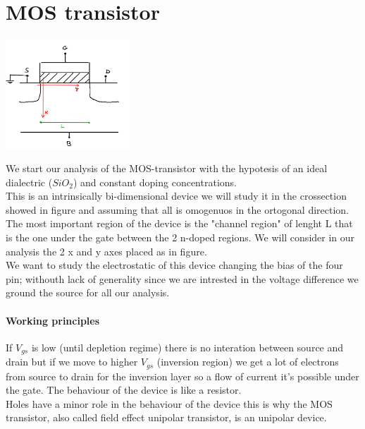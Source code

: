 \chapter{MOS transistor}
\centering
\includegraphics[width=0.35\textwidth]{mos1.png}\\
\raggedright

We start our analysis of the MOS-transistor with the hypotesis of an ideal dialectric ($SiO_2$) and constant doping concentrations.\\
This is an intrinsically bi-dimensional device we will study it in the crossection showed in figure and assuming that all is omogenuos in the ortogonal direction.\\
The most important region of the device is the "channel region" of lenght L that is the one under the gate between the 2 n-doped regions. We will consider in our analysis the 2 x and y axes placed as in figure.\\
We want to study the electrostatic of this device changing the bias of the four pin; withouth lack of generality since we are intrested in the voltage difference we ground the source for all our analysis.\\

\subsubsection{Working principles}
If $V_{gs}$ is low (until depletion regime) there is no interation between source and drain but if we move to higher $V_{gs}$ (inversion region) we get a lot of electrons from source to drain for the inversion layer so a flow of current it's possible under the gate. The behaviour of the device is like a resistor.\\
Holes have a minor role in the behaviour of the device this is why the MOS transistor, also called field effect unipolar transistor, is an unipolar device.\\

